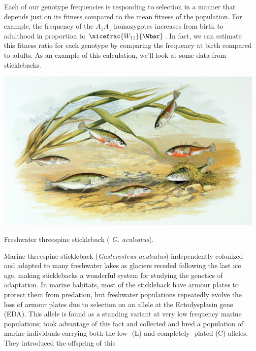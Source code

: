 Each of our genotype frequencies is responding to selection in a
manner that depends just on its fitness compared to the mean fitness
of the population. For example, the frequency of the $A_1A_1$ homozygotes
increases from birth to adulthood in proportion to $\nicefrac{W_{11}}{\Wbar}$. In
fact, we can estimate this fitness ratio for each genotype by comparing
the frequency at birth compared to adults. As an example of this calculation, we'll
look at some data from sticklebacks. 
\begin{marginfigure}
\begin{center}
\includegraphics[width= 1.2 \textwidth]{illustration_images/single_locus_selection/Stickleback/Gasterosteus_aculeatus_1879.jpg}
\end{center}
\caption{Freshwater threespine stickleback ({\it
    G. aculeatus}). } \label{fig:stickleback}
\end{marginfigure}
Marine threespine stickleback ({\it Gasterosteus aculeatus})
independently colonized and adapted to many freshwater lakes
as glaciers receded following the last ice age, making sticklebacks a wonderful system for studying the genetics of adaptation. In marine habitats, most of the stickleback have armour plates to protect them
from predation, but freshwater populations repeatedly evolve the
loss of armour plates due to selection on an allele at the
Ectodysplasin gene (EDA).  This allele is found as a standing variant at very low frequency marine populations;
\citet{Barrett:08} took advantage of this fact and collected and bred
a population of marine individuals carrying both the low- (L) and
completely- plated (C) alleles. They introduced the offspring of this
